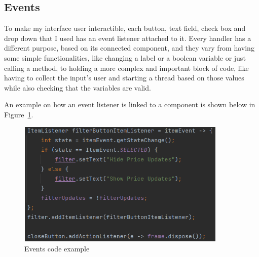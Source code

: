 \documentclass[12pt,a4paper]{report}
\begin{document}
\subsection{Events}
To make my interface user interactible, each button, text field, check box and drop down that I used has an event listener attached to it. Every handler has a different purpose, based on its connected component, and they vary from having some simple functionalities, like changing a label or a boolean variable or just calling a method, to holding a more complex and important block of code, like having to collect the input's user and starting a thread based on those values while also checking that the variables are valid.  

An example on how an event listener is linked to a component is shown below in Figure~\ref{fig:events}.

\begin{figure}[!ht]
	\centering
	\includegraphics[width=10cm,height=6cm]{pics/events.png}
	\caption{Events code example}
	\label{fig:events}
\end{figure}
\end{document}
